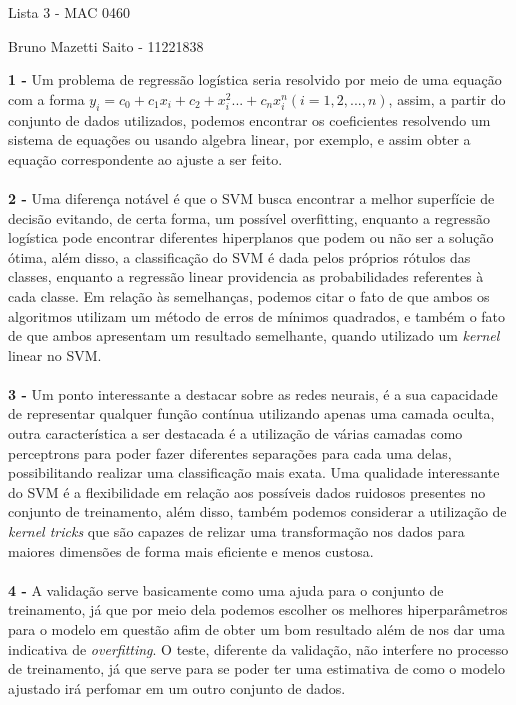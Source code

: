\documentclass[10pt,a4paper]{article}
\begin{document}
\begin{center}
	Lista 3 - MAC 0460
	
	Bruno Mazetti Saito - 11221838
\end{center}

\textbf{1 - } Um problema de regressão logística seria resolvido por meio de uma equação com a forma $y_i = c_0 + c_1 x_i + c_2 + x_i^2 ... + c_n x_i^n (i = 1, 2, ..., n)$, assim, a partir do conjunto de dados utilizados, podemos encontrar os coeficientes resolvendo um sistema de equações ou usando algebra linear, por exemplo, e assim obter a equação correspondente ao ajuste a ser feito. \\ \\

\textbf{2 - } Uma diferença notável é que o SVM busca encontrar a melhor superfície de decisão evitando, de certa forma, um possível overfitting, enquanto a regressão logística pode encontrar diferentes hiperplanos que podem ou não ser a solução ótima, além disso, a classificação do SVM é dada pelos próprios rótulos das classes, enquanto a regressão linear providencia as probabilidades referentes à cada classe. Em relação às semelhanças, podemos citar o fato de que ambos os algoritmos utilizam um método de erros de mínimos quadrados, e também o fato de que ambos apresentam um resultado semelhante, quando utilizado um \textit{kernel} linear no SVM. \\ \\

\textbf{3 - } Um ponto interessante a destacar sobre as redes neurais, é a sua capacidade de representar qualquer função contínua utilizando apenas uma camada oculta, outra característica a ser destacada é a utilização de várias camadas como perceptrons para poder fazer diferentes separações para cada uma delas, possibilitando realizar uma classificação mais exata. Uma qualidade interessante do SVM é a flexibilidade em relação aos possíveis dados ruidosos presentes no conjunto de treinamento, além disso, também podemos considerar a utilização de \textit{kernel tricks} que são capazes de relizar uma transformação nos dados para maiores dimensões de forma mais eficiente e menos custosa. \\ \\

\textbf{4 - } A validação serve basicamente como uma ajuda para o conjunto de treinamento, já que por meio dela podemos escolher os melhores hiperparâmetros para o modelo em questão afim de obter um bom resultado além de nos dar uma indicativa de \textit{overfitting}. O teste, diferente da validação, não interfere no processo de treinamento, já que serve para se poder ter uma estimativa de como o modelo ajustado irá perfomar em um outro conjunto de dados. \\ \\
\end{document}

